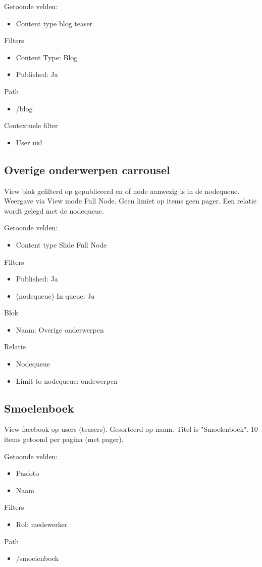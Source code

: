 Getoonde velden: 
\begin{itemize}
\item Content type blog teaser
\end{itemize}

Filters
\begin{itemize}
\item Content Type: Blog
\item Published: Ja
\end{itemize}

Path
\begin{itemize}
\item /blog
\end{itemize}

Contextuele filter
\begin{itemize}
\item User uid
\end{itemize}

\subsection{Overige onderwerpen carrousel}
View blok gefilterd op gepubliceerd en of node aanwezig is in de nodequeue. Weergave via View mode Full Node. Geen limiet op items geen pager. Een relatie wordt gelegd met de nodequeue.

Getoonde velden: 
\begin{itemize}
\item Content type Slide Full Node
\end{itemize}

Filters
\begin{itemize}
\item Published: Ja
\item (nodequeue) In queue: Ja
\end{itemize}

Blok
\begin{itemize}
\item Naam: Overige onderwerpen
\end{itemize}

Relatie
\begin{itemize}
\item Nodequeue
\item Limit to nodequeue: ondewerpen
\end{itemize}

\subsection{Smoelenboek}
View facebook op users (teasers). Gesorteerd op naam. Titel is "Smoelenboek". 10 items getoond per pagina (met pager).

Getoonde velden: 
\begin{itemize}
\item Pasfoto
\item Naam
\end{itemize}

Filters
\begin{itemize}
\item Rol: medewerker
\end{itemize}

Path
\begin{itemize}
\item /smoelenboek
\end{itemize}
